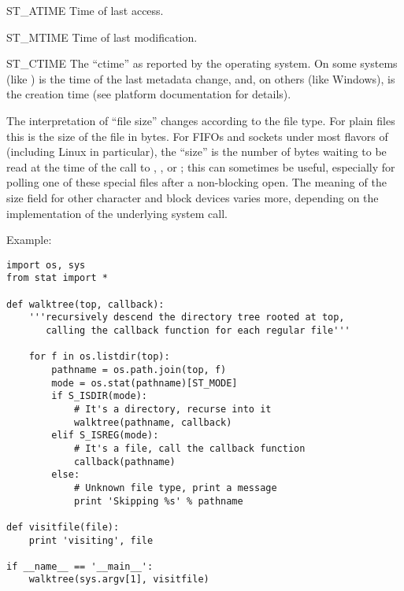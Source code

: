 \begin{datadesc}{ST_ATIME}
Time of last access.
\end{datadesc}

\begin{datadesc}{ST_MTIME}
Time of last modification.
\end{datadesc}

\begin{datadesc}{ST_CTIME}
The ``ctime'' as reported by the operating system.  On some systems
(like \UNIX) is the time of the last metadata change, and, on others
(like Windows), is the creation time (see platform documentation for
details).
\end{datadesc}

The interpretation of ``file size'' changes according to the file
type.  For plain files this is the size of the file in bytes.  For
FIFOs and sockets under most flavors of \UNIX{} (including Linux in
particular), the ``size'' is the number of bytes waiting to be read at
the time of the call to , ,
or ; this can sometimes be useful, especially for
polling one of these special files after a non-blocking open.  The
meaning of the size field for other character and block devices varies
more, depending on the implementation of the underlying system call.

Example:

\begin{verbatim}
import os, sys
from stat import *

def walktree(top, callback):
    '''recursively descend the directory tree rooted at top,
       calling the callback function for each regular file'''

    for f in os.listdir(top):
        pathname = os.path.join(top, f)
        mode = os.stat(pathname)[ST_MODE]
        if S_ISDIR(mode):
            # It's a directory, recurse into it
            walktree(pathname, callback)
        elif S_ISREG(mode):
            # It's a file, call the callback function
            callback(pathname)
        else:
            # Unknown file type, print a message
            print 'Skipping %s' % pathname

def visitfile(file):
    print 'visiting', file

if __name__ == '__main__':
    walktree(sys.argv[1], visitfile)
\end{verbatim}
